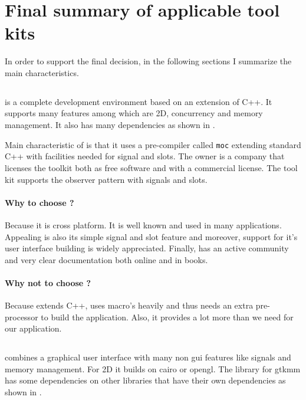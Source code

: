 \section{Final summary of applicable tool kits}
\label{sec:final-listing}

In order to support the final decision, in the following sections I summarize
the main characteristics.

\subsection{} 

 is a complete development environment based on an extension of C++. It
supports many features among which are 2D, concurrency and memory management.
It also has many dependencies as shown in \cite{qt:qt-dep}.

Main characteristic of  is that it uses a pre-compiler called
\texttt{moc} extending standard C++ with facilities needed for signal and
slots. The owner is a company  that licenses the  toolkit both
as free software and with a commercial license. The tool kit  supports
the observer pattern with signals and slots. 

\paragraph{Why to choose ?} Because it is cross platform. It is well
known and used in many applications. Appealing is also its simple signal and
slot feature and moreover, support for it's user interface building is 
widely appreciated.  Finally,  has an active community and very clear
documentation both online and in books. 

\paragraph{Why not to choose ?} Because  extends C++, uses macro's
heavily and thus needs an extra pre-processor to build the application. Also,
it provides a lot more than we need for our application. 

\subsection{}

 combines a graphical user interface with many non gui features like
signals and memory management. For 2D it builds on cairo or opengl. The library
for gtkmm has some dependencies on other libraries that have their own
dependencies as shown in \cite{gtkmm:gtk+-dep}.

